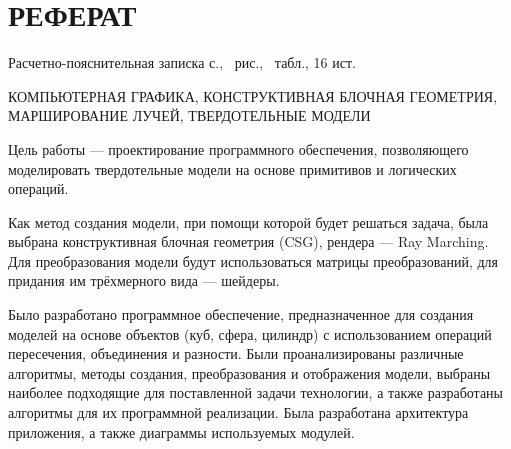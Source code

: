 \section*{РЕФЕРАТ}

Расчетно-пояснительная записка \pageref{LastPage} с., \totalfigures\ рис., \totaltables\ табл., 16 ист.

КОМПЬЮТЕРНАЯ ГРАФИКА, КОНСТРУКТИВНАЯ БЛОЧНАЯ ГЕОМЕТРИЯ, МАРШИРОВАНИЕ ЛУЧЕЙ, ТВЕРДОТЕЛЬНЫЕ МОДЕЛИ

Цель работы --- проектирование программного обеспечения, позволяющего моделировать твердотельные модели на основе примитивов и логических операций. 

Как метод создания модели, при помощи которой будет 
решаться  задача,  была  выбрана  конструктивная  блочная геометрия  (CSG), 
рендера  ---  Ray Marching.
Для  преобразования  модели  будут  использоваться 
матрицы преобразований, для придания им трёхмерного вида --- шейдеры.

Было  разработано  программное обеспечение, предназначенное для создания моделей на основе объектов (куб, 
сфера, цилиндр) с использованием операций пересечения, объединения и 
разности.  
Были  проанализированы  различные  алгоритмы,  методы  создания, 
преобразования  и  отображения  модели,  выбраны  наиболее  подходящие  для поставленной  задачи  технологии,  а  также  разработаны  алгоритмы  для  их 
программной реализации. 
Была разработана архитектура приложения, а также 
диаграммы используемых модулей. 

\pagebreak